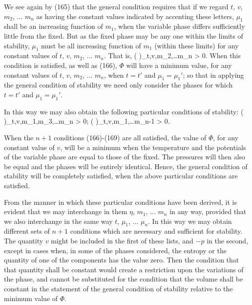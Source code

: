 \documentclass[12pt]{article}
\begin{document}
We see again by (165) that the general condition requires that if we regard $t$, $v$, $m_2$, ... $m_n$ as having the constant values indicated by accenting these letters, $\mu_1$ shall be an increasing function of $m_1$, when the variable phase differs sufficiently little from the fixed. But as the fixed phase may be any one within the limits of stability, $\mu_1$ must be all increasing function of $m_1$ (within these limits) for any constant values of $t$, $v$, $m_2$, ... $m_n$. That is,
\eqs \left(  \right)_{t,v,m_2,\dots m_n} > 0.\label{167}\eqe
When this condition is satisfied, as well as (166), $\Phi$ will have a minimum value, for any constant values of $t$, $v$, $m_2$, ... $m_n$, when $t =t'$ and $\mu_1 = \mu_1'$; so that in applying the general condition of stability we need only consider the phases for which $t =t'$ and $\mu_1 = \mu_1'$.


In this way we may also obtain the following particular conditions of stability:
\eqs \left(  \right)_{t,v,m_1,m_3,\dots m_n} > 0;  \label{168}\eqe
\eqs \left(  \right)_{t,v,m_1,\dots m_{n-1}} > 0. \label{169}\eqe


When the $n+1$ conditions (166)-(169) are all satisfied, the value of $\Phi$, for any constant value of $v$, will be a minimum when the temperature and the potentials of the variable phase are equal to those of the fixed. The pressures will then also be equal and the phases will be entirely identical. Hence, the general condition of stability will be completely satisfied, when the above particular conditions are satisfied.


From the manner in which these particular conditions have been derived, it is evident that we may interchange in them $\eta$, $m_1$, ... $m_n$ in any way, provided that we also interchange in the same way $t$, $\mu_1$, ... $\mu_n$.  In this way we may obtain different sets of $n + 1$ conditions which are necessary and sufficient for stability.  The quantity $v$ might be included in the first of these lists, and $-p$ in the second, except in cases when, in some of the phases considered, the entropy or the quantity of one of the components has the value zero. Then the condition that that quantity shall be constant would create a restriction upon the variations of the phase, and cannot be substituted for the condition that the volume shall be constant in the statement of the general condition of stability relative to the minimum value of $\Phi$.
\end{document}
